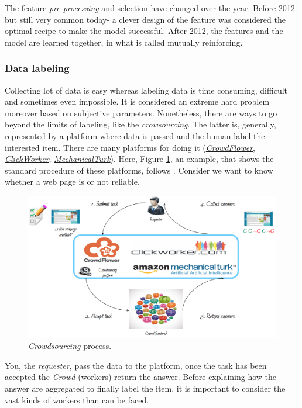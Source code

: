 The feature \emph{pre-processing} and selection have changed over the year. Before 2012- but still very common today- a clever design of the feature was considered the optimal recipe to make the model successful. After 2012, %
the features and the model are learned together, in what is called mutually reinforcing.

\subsubsection*{Data labeling}

Collecting lot of data is easy whereas labeling data is time consuming, difficult and sometimes even impossible. It is considered an extreme hard problem moreover based on subjective parameters. Nonetheless, there are ways to go beyond the limits of labeling, like the \emph{crowsourcing}. The latter is, generally, represented by a platform where data is passed and the human label the interested item. There are many platforms for doing it (\href{https://en.wikipedia.org/wiki/CrowdFlower}{\emph{CrowdFlower}}, \href{https://www.clickworker.com}{\emph{ClickWorker}}, \href{https://en.wikipedia.org/wiki/Amazon_Mechanical_Turk}{\emph{MechanicalTurk}}).  Here, Figure \ref{pic:crowdsourcing}, an example, that shows the standard procedure of these platforms, follows . Consider we want to know whether a web page is or not reliable.  

\begin{figure}[H]%
 \centering
 \includegraphics[width=13cm]{./img/08/crowdsourcing}
 \caption{\label{pic:crowdsourcing} \emph{Crowdsourcing} process.}
\end{figure}

You, the \emph{requester}, pass the data to the platform, once the task has been accepted the \emph{Crowd} (workers) return the answer. Before explaining how the answer are aggregated to finally label the item, it is important to consider the vast kinds of workers than can be faced.

